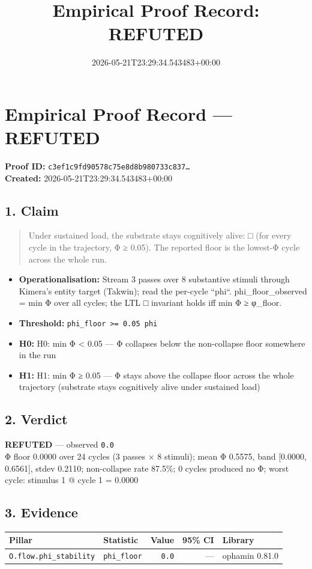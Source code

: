 \documentclass{article}
\title{Empirical Proof Record: REFUTED}
\date{2026-05-21T23:29:34.543483+00:00}
\begin{document}
\maketitle
\section*{Empirical Proof Record --- \textcolor{refuted}{\textbf{REFUTED}}}
\textbf{Proof ID:} \texttt{c3ef1c9fd90578c75e8d8b980733c837\dots}\\
\textbf{Created:} 2026-05-21T23:29:34.543483+00:00
\subsection*{1. Claim}
\begin{quote}Under sustained load, the substrate stays cognitively alive: □ (for every cycle in the trajectory, Φ ≥ 0.05). The reported floor is the lowest-Φ cycle across the whole run.\end{quote}
\begin{itemize}
\item \textbf{Operationalisation:} Stream 3 passes over 8 substantive stimuli through Kimera's entity target (Takwin); read the per-cycle ``phi``. phi\_floor\_observed = min Φ over all cycles; the LTL □ invariant holds iff min Φ ≥ φ\_floor.
\item \textbf{Threshold:} \texttt{phi\_floor >= 0.05 phi}
\item \textbf{H0:} H0: min Φ < 0.05 — Φ collapses below the non-collapse floor somewhere in the run
\item \textbf{H1:} H1: min Φ ≥ 0.05 — Φ stays above the collapse floor across the whole trajectory (substrate stays cognitively alive under sustained load)
\end{itemize}
\subsection*{2. Verdict}
\textcolor{refuted}{\textbf{REFUTED}} --- observed \texttt{0.0}\\
Φ floor 0.0000 over 24 cycles (3 passes × 8 stimuli); mean Φ 0.5575, band [0.0000, 0.6561], stdev 0.2110; non-collapse rate 87.5\%; 0 cycles produced no Φ; worst cycle: stimulus 1 @ cycle 1 = 0.0000
\subsection*{3. Evidence}
\begin{tabular}{llrrl}\toprule
\textbf{Pillar} & \textbf{Statistic} & \textbf{Value} & \textbf{95\% CI} & \textbf{Library} \\\midrule
\texttt{O.flow.phi\_stability} & \texttt{phi\_floor} & \texttt{0.0} & --- & ophamin 0.81.0 \\
\bottomrule\end{tabular}
\end{document}
